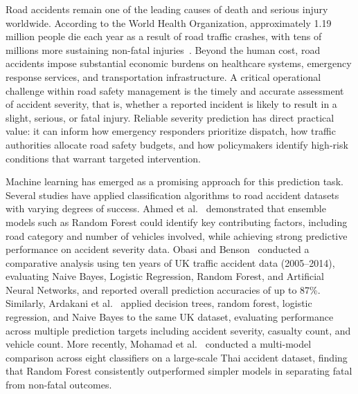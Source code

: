 Road accidents remain one of the leading causes of death and serious injury 
worldwide. According to the World Health Organization, approximately 1.19 million 
people die each year as a result of road traffic crashes, with tens of millions 
more sustaining non-fatal injuries~\cite{who2023roadsafety}. Beyond the human 
cost, road accidents impose substantial economic burdens on healthcare systems, 
emergency response services, and transportation infrastructure. A critical 
operational challenge within road safety management is the timely and accurate 
assessment of accident severity, that is, whether a reported incident is likely 
to result in a slight, serious, or fatal injury. Reliable severity prediction has 
direct practical value: it can inform how emergency responders prioritize 
dispatch, how traffic authorities allocate road safety budgets, and how 
policymakers identify high-risk conditions that warrant targeted intervention.

Machine learning has emerged as a promising approach for this prediction task. 
Several studies have applied classification algorithms to road accident datasets 
with varying degrees of success. Ahmed et al.~\cite{ahmed2023explainable} 
demonstrated that ensemble models such as Random Forest could identify key 
contributing factors, including road category and number of vehicles involved, 
while achieving strong predictive performance on accident severity data. Obasi 
and Benson~\cite{obasi2023evaluating} conducted a comparative analysis using ten 
years of UK traffic accident data (2005--2014), evaluating Naive Bayes, Logistic 
Regression, Random Forest, and Artificial Neural Networks, and reported overall 
prediction accuracies of up to 87\%. Similarly, Ardakani et 
al.~\cite{ardakani2023road} applied decision trees, random forest, logistic 
regression, and Naive Bayes to the same UK dataset, evaluating performance across 
multiple prediction targets including accident severity, casualty count, and 
vehicle count. More recently, Mohamad et al.~\cite{mohamad2025thailand} conducted 
a multi-model comparison across eight classifiers on a large-scale Thai accident 
dataset, finding that Random Forest consistently outperformed simpler models in 
separating fatal from non-fatal outcomes.

